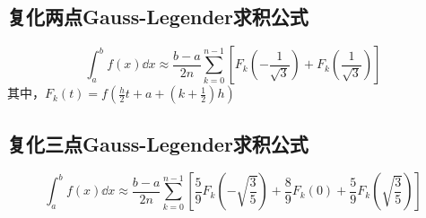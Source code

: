 \subsection{复化两点Gauss-Legender求积公式}
\begin{equation*}
    \int_{a}^{b}f(x)\dd{x} \approx \frac{b-a}{2n}\sum_{k=0}^{n-1}[F_k(-\frac{1}{\sqrt{3}})+F_k(\frac{1}{\sqrt{3}})]
\end{equation*}
其中，$F_k(t) = f(\frac{h}{2}t+a+(k+\frac{1}{2})h)$

\subsection{复化三点Gauss-Legender求积公式}
\begin{equation*}
    \int_{a}^{b}f(x)\dd{x} \approx \frac{b-a}{2n}\sum_{k=0}^{n-1}[\frac{5}{9}F_k(-\sqrt{\frac{3}{5}})+\frac{8}{9}F_k(0)+\frac{5}{9}F_k(\sqrt{\frac{3}{5}})]
\end{equation*}


